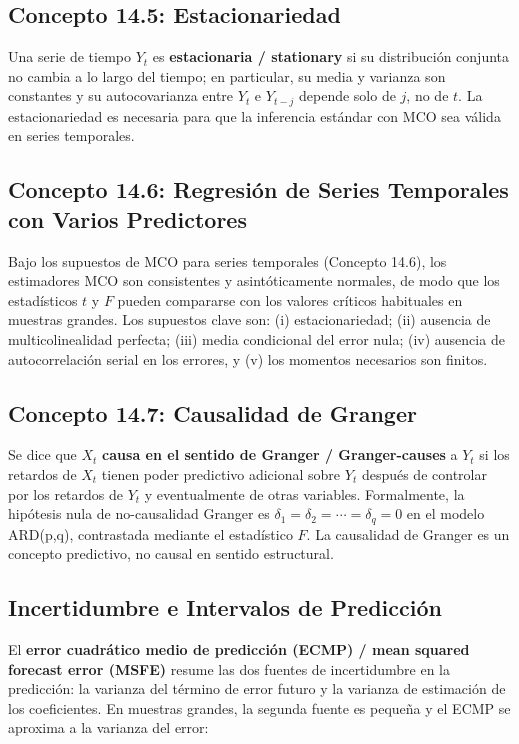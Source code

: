 \documentclass[12pt]{article}
\begin{document}
\subsection{Concepto 14.5: Estacionariedad}

Una serie de tiempo $Y_t$ es \textbf{estacionaria / stationary} si su distribuci\'on conjunta no cambia a lo largo del tiempo; en particular, su media y varianza son constantes y su autocovarianza entre $Y_t$ e $Y_{t-j}$ depende solo de $j$, no de $t$. La estacionariedad es necesaria para que la inferencia est\'andar con MCO sea v\'alida en series temporales.

\subsection{Concepto 14.6: Regresi\'on de Series Temporales con Varios Predictores}

Bajo los supuestos de MCO para series temporales (Concepto 14.6), los estimadores MCO son consistentes y asint\'oticamente normales, de modo que los estad\'isticos $t$ y $F$ pueden compararse con los valores cr\'iticos habituales en muestras grandes. Los supuestos clave son: (i) estacionariedad; (ii) ausencia de multicolinealidad perfecta; (iii) media condicional del error nula; (iv) ausencia de autocorrelaci\'on serial en los errores, y (v) los momentos necesarios son finitos.

\subsection{Concepto 14.7: Causalidad de Granger}

Se dice que $X_t$ \textbf{causa en el sentido de Granger / Granger-causes} a $Y_t$ si los retardos de $X_t$ tienen poder predictivo adicional sobre $Y_t$ despu\'es de controlar por los retardos de $Y_t$ y eventualmente de otras variables. Formalmente, la hip\'otesis nula de no-causalidad Granger es $\delta_1 = \delta_2 = \cdots = \delta_q = 0$ en el modelo ARD(p,q), contrastada mediante el estad\'istico $F$. La causalidad de Granger es un concepto predictivo, no causal en sentido estructural.

\subsection{Incertidumbre e Intervalos de Predicci\'on}

El \textbf{error cuadr\'atico medio de predicci\'on (ECMP) / mean squared forecast error (MSFE)} resume las dos fuentes de incertidumbre en la predicci\'on: la varianza del t\'ermino de error futuro y la varianza de estimaci\'on de los coeficientes. En muestras grandes, la segunda fuente es peque\~na y el ECMP se aproxima a la varianza del error:
\end{document}
